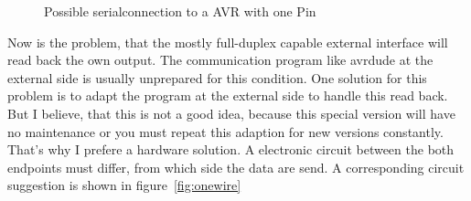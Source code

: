 \begin{figure}[H]
\centering
{}
\caption{Possible serialconnection to a AVR with one Pin}
\label{fig:onewire-simple}
\end{figure}

Now is the problem, that the mostly full-duplex capable external interface will
read back the own output.
The communication program like avrdude at the external side is usually unprepared for this condition.
One solution for this problem is to adapt the program at the external side to handle
this read back.
But I believe, that this is not a good idea, because this special version will 
have no maintenance or you must repeat this adaption for new versions constantly.
That's why I prefere a hardware solution.
A electronic circuit between the both endpoints must differ, from which side
the data are send.
A corresponding circuit suggestion is shown in figure~\ref{fig:onewire}

